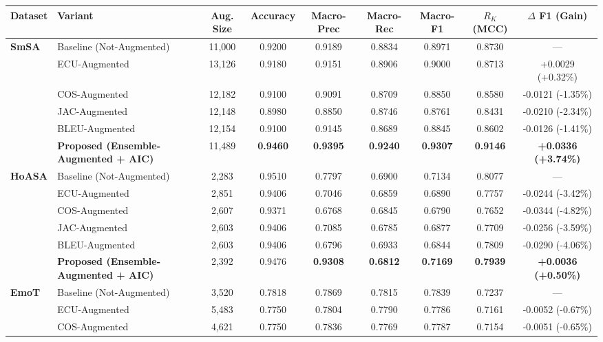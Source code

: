 \begin{tabularx}{\textwidth}{l >{\raggedright\arraybackslash}X c c c c c c c}
\toprule
\textbf{Dataset} & \textbf{Variant} & \textbf{Aug. Size} & \textbf{Accuracy} & \textbf{Macro-Prec} & \textbf{Macro-Rec} & \textbf{Macro-F1} & \textbf{$R_K$ (MCC)} & \textbf{$\Delta$ F1 (Gain)} \\
\midrule
\multirow{6}{*}{\textbf{SmSA}}
& Baseline (Not-Augmented) & 11,000 & 0.9200 & 0.9189 & 0.8834 & 0.8971 & 0.8730 & --- \\
& ECU-Augmented & 13,126 & 0.9180 & 0.9151 & 0.8906 & 0.9000 & 0.8713 & +0.0029 (+0.32\%) \\
& COS-Augmented & 12,182 & 0.9100 & 0.9091 & 0.8709 & 0.8850 & 0.8580 & -0.0121 (-1.35\%) \\
& JAC-Augmented & 12,148 & 0.8980 & 0.8850 & 0.8746 & 0.8761 & 0.8431 & -0.0210 (-2.34\%) \\
& BLEU-Augmented & 12,154 & 0.9100 & 0.9145 & 0.8689 & 0.8845 & 0.8602 & -0.0126 (-1.41\%) \\
& \textbf{Proposed (Ensemble-Augmented + AIC)} & 11,489 & \textbf{0.9460} & \textbf{0.9395} & \textbf{0.9240} & \textbf{0.9307} & \textbf{0.9146} & \textbf{+0.0336 (+3.74\%)} \\
\midrule
\multirow{6}{*}{\textbf{HoASA}}
& Baseline (Not-Augmented) & 2,283 & 0.9510 & 0.7797 & 0.6900 & 0.7134 & 0.8077 & --- \\
& ECU-Augmented & 2,851 & 0.9406 & 0.7046 & 0.6859 & 0.6890 & 0.7757 & -0.0244 (-3.42\%) \\
& COS-Augmented & 2,607 & 0.9371 & 0.6768 & 0.6845 & 0.6790 & 0.7652 & -0.0344 (-4.82\%) \\
& JAC-Augmented & 2,603 & 0.9406 & 0.7085 & 0.6785 & 0.6877 & 0.7709 & -0.0256 (-3.59\%) \\
& BLEU-Augmented & 2,603 & 0.9406 & 0.6796 & 0.6933 & 0.6844 & 0.7809 & -0.0290 (-4.06\%) \\
& \textbf{Proposed (Ensemble-Augmented + AIC)} & 2,392 & 0.9476 & \textbf{0.9308} & \textbf{0.6812} & \textbf{0.7169} & \textbf{0.7939} & \textbf{+0.0036 (+0.50\%)} \\
\midrule
\multirow{6}{*}{\textbf{EmoT}}
& Baseline (Not-Augmented) & 3,520 & 0.7818 & 0.7869 & 0.7815 & 0.7839 & 0.7237 & --- \\
& ECU-Augmented & 5,483 & 0.7750 & 0.7804 & 0.7790 & 0.7786 & 0.7161 & -0.0052 (-0.67\%) \\
& COS-Augmented & 4,621 & 0.7750 & 0.7836 & 0.7769 & 0.7787 & 0.7154 & -0.0051 (-0.65\%) \\

\end{tabularx}
